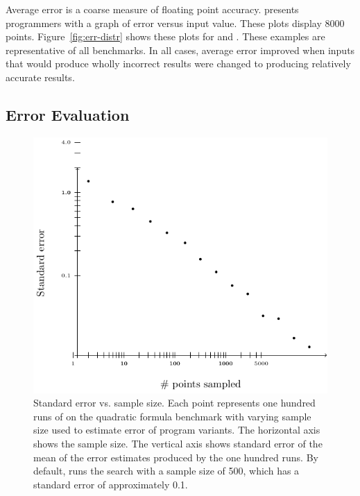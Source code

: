 \documentclass[paper.tex]{subfiles}
\begin{document}
Average error is a coarse measure of floating point accuracy.  \casio
presents programmers with a graph of error versus input value.  These
plots display 8000 points.  Figure~\ref{fig:err-distr} shows these
plots for  and .  These examples are
representative of all benchmarks.  In all cases, average error
improved when inputs that would produce wholly incorrect results were
changed to producing relatively accurate results.

\subsection{Error Evaluation}
\label{sec:eval-eval}

\begin{figure}
\includegraphics[width=0.9\columnwidth]{fig/eval-err.pdf}
\caption{Standard error vs. sample size. Each point represents one
  hundred runs of \casio on the quadratic formula benchmark with
  varying sample size used to estimate error of program variants. The
  horizontal axis shows the sample size. The vertical axis shows
  standard error of the mean of the error estimates produced by the
  one hundred runs. By default, \casio runs the search with a sample
  size of 500, which has a standard error of approximately 0.1.}

\label{fig:eval-err}
\end{figure}
\end{document}
